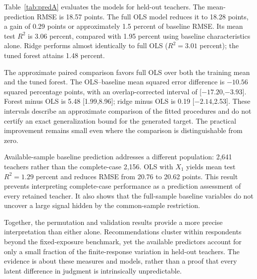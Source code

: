 \begin{addition}
Table~\ref{tab:predA} evaluates the models for held-out teachers. The mean-prediction RMSE is 18.57 points. The full OLS model reduces it to 18.28 points, a gain of 0.29 points or approximately 1.5 percent of baseline RMSE. Its mean test $R^2$ is 3.06 percent, compared with 1.95 percent using baseline characteristics alone. Ridge performs almost identically to full OLS ($R^2=3.01$ percent); the tuned forest attains 1.48 percent.
\end{addition}
\begin{addition}
The approximate paired comparison favors full OLS over both the training mean and the tuned forest. The OLS--baseline mean squared error difference is $-10.56$ squared percentage points, with an overlap-corrected interval of [$-17.20$,$-3.93$]. Forest minus OLS is 5.48 [1.99,8.96]; ridge minus OLS is 0.19 [$-2.14$,2.53]. These intervals describe an approximate comparison of the fitted procedures and do not certify an exact generalization bound for the generated target. The practical improvement remains small even where the comparison is distinguishable from zero.

Available-sample baseline prediction addresses a different population: 2,641 teachers rather than the complete-case 2,156. OLS with $X_1$ yields mean test $R^2=1.29$ percent and reduces RMSE from 20.76 to 20.62 points. This result prevents interpreting complete-case performance as a prediction assessment of every retained teacher. It also shows that the full-sample baseline variables do not uncover a large signal hidden by the common-sample restriction.

Together, the permutation and validation results provide a more precise interpretation than either alone. Recommendations cluster within respondents beyond the fixed-exposure benchmark, yet the available predictors account for only a small fraction of the finite-response variation in held-out teachers. The evidence is about these measures and models, rather than a proof that every latent difference in judgment is intrinsically unpredictable.
\end{addition}




